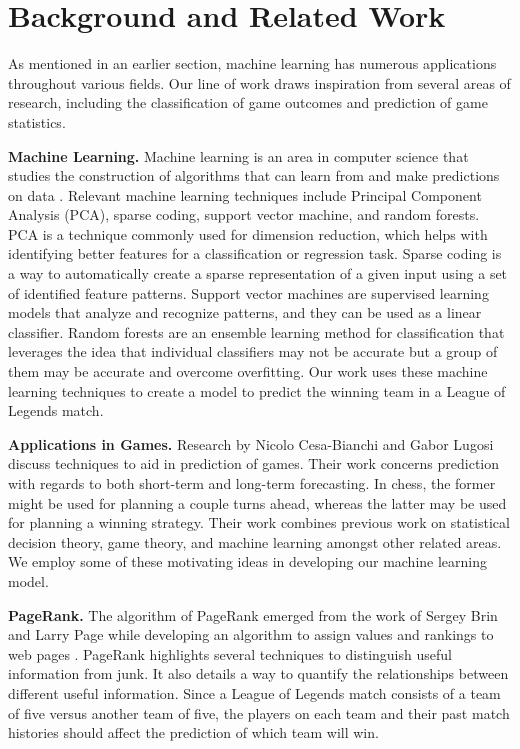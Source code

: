 \section{Background and Related Work}

As mentioned in an earlier section, machine learning has numerous applications
throughout various fields.  Our line of work draws inspiration from 
several areas of research, including the classification of game outcomes and 
prediction of game statistics.  

\textbf{Machine Learning. }
Machine learning is an area in computer science that studies the construction of 
algorithms that can learn from and make predictions on data \cite{5_wikipedia_2015}.  
Relevant machine learning techniques include Principal Component Analysis (PCA), 
sparse coding, support vector machine, and random forests.  PCA is a technique 
commonly used for dimension reduction, which helps with identifying better features 
for a classification or regression task. Sparse coding is a way to automatically 
create a sparse representation of a given input using a set of identified feature 
patterns.  Support vector machines are supervised learning models that analyze and 
recognize patterns, and they can be used as a linear classifier.  Random forests 
are an ensemble learning method for classification that leverages the idea that 
individual classifiers may not be accurate but a group of them may be accurate and 
overcome overfitting.  Our work uses these machine learning techniques to create a 
model to predict the winning team in a League of Legends match.

\textbf{Applications in Games. }
Research by Nicolo Cesa-Bianchi and Gabor Lugosi discuss techniques to aid in 
prediction of games.  Their work concerns prediction with regards to both 
short-term and long-term forecasting.  In chess, the former might be used for 
planning a couple turns 
ahead, whereas the latter may be used for planning a winning strategy.  Their work 
combines previous work on statistical decision theory, game theory, and machine learning 
amongst other related areas.  We employ some of these motivating ideas in developing our
machine learning model.  

\textbf{PageRank. }The algorithm of PageRank emerged from the work of Sergey Brin and Larry 
Page while developing an algorithm to assign values and rankings to web pages \cite{3_page_brin_1998}.  
PageRank highlights several techniques to distinguish useful information 
from junk.  It also details a way to quantify the relationships between different 
useful information.  Since a League of Legends match consists of a team of five versus 
another team of five, the players on each team and their past match histories should 
affect the prediction of which team will win.  

